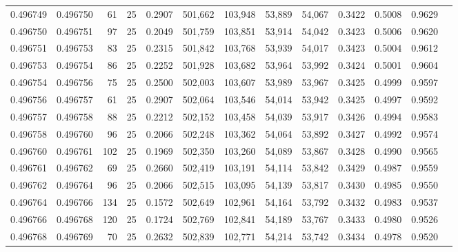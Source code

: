 \begin{tabular}{rrrrrrrrrrrrr}
0.496749 & 0.496750 &    61 &  25 &                                     0.2907 & 501,662 & 103,948 &  53,889 &  54,067 & 0.3422 & 0.5008 & 0.9629 \\
0.496750 & 0.496751 &    97 &  25 &                                     0.2049 & 501,759 & 103,851 &  53,914 &  54,042 & 0.3423 & 0.5006 & 0.9620 \\
0.496751 & 0.496753 &    83 &  25 &                                     0.2315 & 501,842 & 103,768 &  53,939 &  54,017 & 0.3423 & 0.5004 & 0.9612 \\
0.496753 & 0.496754 &    86 &  25 &                                     0.2252 & 501,928 & 103,682 &  53,964 &  53,992 & 0.3424 & 0.5001 & 0.9604 \\
0.496754 & 0.496756 &    75 &  25 &                                     0.2500 & 502,003 & 103,607 &  53,989 &  53,967 & 0.3425 & 0.4999 & 0.9597 \\
0.496756 & 0.496757 &    61 &  25 &                                     0.2907 & 502,064 & 103,546 &  54,014 &  53,942 & 0.3425 & 0.4997 & 0.9592 \\
0.496757 & 0.496758 &    88 &  25 &                                     0.2212 & 502,152 & 103,458 &  54,039 &  53,917 & 0.3426 & 0.4994 & 0.9583 \\
0.496758 & 0.496760 &    96 &  25 &                                     0.2066 & 502,248 & 103,362 &  54,064 &  53,892 & 0.3427 & 0.4992 & 0.9574 \\
0.496760 & 0.496761 &   102 &  25 &                                     0.1969 & 502,350 & 103,260 &  54,089 &  53,867 & 0.3428 & 0.4990 & 0.9565 \\
0.496761 & 0.496762 &    69 &  25 &                                     0.2660 & 502,419 & 103,191 &  54,114 &  53,842 & 0.3429 & 0.4987 & 0.9559 \\
0.496762 & 0.496764 &    96 &  25 &                                     0.2066 & 502,515 & 103,095 &  54,139 &  53,817 & 0.3430 & 0.4985 & 0.9550 \\
0.496764 & 0.496766 &   134 &  25 &                                     0.1572 & 502,649 & 102,961 &  54,164 &  53,792 & 0.3432 & 0.4983 & 0.9537 \\
0.496766 & 0.496768 &   120 &  25 &                                     0.1724 & 502,769 & 102,841 &  54,189 &  53,767 & 0.3433 & 0.4980 & 0.9526 \\
0.496768 & 0.496769 &    70 &  25 &                                     0.2632 & 502,839 & 102,771 &  54,214 &  53,742 & 0.3434 & 0.4978 & 0.9520 \\

\end{tabular}
